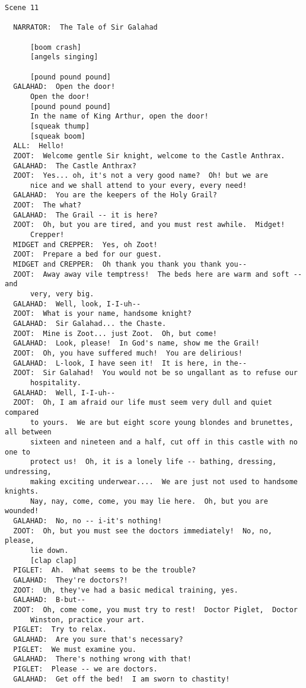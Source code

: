 \documentclass{article}
\begin{document}
\begin{verbatim}
Scene 11

  NARRATOR:  The Tale of Sir Galahad

      [boom crash]
      [angels singing]

      [pound pound pound]
  GALAHAD:  Open the door!
      Open the door!
      [pound pound pound]
      In the name of King Arthur, open the door!
      [squeak thump]
      [squeak boom]
  ALL:  Hello!
  ZOOT:  Welcome gentle Sir knight, welcome to the Castle Anthrax.
  GALAHAD:  The Castle Anthrax?
  ZOOT:  Yes... oh, it's not a very good name?  Oh! but we are
      nice and we shall attend to your every, every need!
  GALAHAD:  You are the keepers of the Holy Grail?
  ZOOT:  The what?
  GALAHAD:  The Grail -- it is here?
  ZOOT:  Oh, but you are tired, and you must rest awhile.  Midget!
      Crepper!
  MIDGET and CREPPER:  Yes, oh Zoot!
  ZOOT:  Prepare a bed for our guest.
  MIDGET and CREPPER:  Oh thank you thank you thank you--
  ZOOT:  Away away vile temptress!  The beds here are warm and soft -- and
      very, very big.
  GALAHAD:  Well, look, I-I-uh--
  ZOOT:  What is your name, handsome knight?
  GALAHAD:  Sir Galahad... the Chaste.
  ZOOT:  Mine is Zoot... just Zoot.  Oh, but come!
  GALAHAD:  Look, please!  In God's name, show me the Grail!
  ZOOT:  Oh, you have suffered much!  You are delirious!
  GALAHAD:  L-look, I have seen it!  It is here, in the--
  ZOOT:  Sir Galahad!  You would not be so ungallant as to refuse our
      hospitality.
  GALAHAD:  Well, I-I-uh--
  ZOOT:  Oh, I am afraid our life must seem very dull and quiet compared
      to yours.  We are but eight score young blondes and brunettes, all between
      sixteen and nineteen and a half, cut off in this castle with no one to
      protect us!  Oh, it is a lonely life -- bathing, dressing, undressing,
      making exciting underwear....  We are just not used to handsome knights.
      Nay, nay, come, come, you may lie here.  Oh, but you are wounded!
  GALAHAD:  No, no -- i-it's nothing!
  ZOOT:  Oh, but you must see the doctors immediately!  No, no, please,
      lie down.
      [clap clap]
  PIGLET:  Ah.  What seems to be the trouble?
  GALAHAD:  They're doctors?!
  ZOOT:  Uh, they've had a basic medical training, yes.
  GALAHAD:  B-but--
  ZOOT:  Oh, come come, you must try to rest!  Doctor Piglet,  Doctor
      Winston, practice your art.
  PIGLET:  Try to relax.
  GALAHAD:  Are you sure that's necessary?
  PIGLET:  We must examine you.
  GALAHAD:  There's nothing wrong with that!
  PIGLET:  Please -- we are doctors.
  GALAHAD:  Get off the bed!  I am sworn to chastity!

\end{verbatim}
\end{document}
